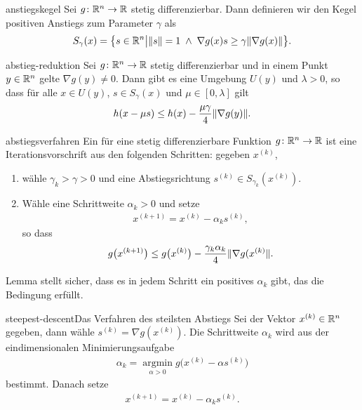 \begin{Definition}{anstiegskegel}
  Sei $g\colon \mathbb R^n\to \mathbb R$ stetig differenzierbar. Dann definieren wir
  den Kegel positiven Anstiegs zum Parameter $\gamma$ als
  \begin{gather}
    S_\gamma(x) = \bigl\{ s\in\mathbb R^n \big|
    \lVert s\rVert = 1 \;\wedge \;
    \nabla g(x)s \ge \gamma\lVert\nabla g(x)\rVert
    \bigr\}.
  \end{gather}  
\end{Definition}

\begin{Lemma}{abstieg-reduktion}
  Sei $g\colon\mathbb R^n\to\mathbb R$ stetig differenzierbar und in einem Punkt
  $y\in\mathbb R^n$ gelte $\nabla g(y) \neq 0$. Dann gibt es eine Umgebung
  $U(y)$ und $\lambda>0$, so dass für alle $x\in U(y)$,
  $s\in S_\gamma(x)$ und $\mu\in [0,\lambda]$ gilt
  \begin{gather}
    h(x-\mu s) \le h(x) - \frac{\mu\gamma}4 \lVert\nabla g(y)\rVert.
  \end{gather}
\end{Lemma}

\begin{Definition}{abstiegsverfahren}
  Ein  für eine stetig differenzierbare
  Funktion $g\colon \mathbb R^n\to\mathbb R$ ist eine Iterationsvorschrift aus den
  folgenden Schritten: gegeben $x^{(k)}$,
  \begin{enumerate}
  \item wähle $\gamma_k>\gamma>0$ und eine Abstiegsrichtung
    $s^{(k)} \in S_{\gamma_k}(x^{(k)})$.
  \item Wähle eine Schrittweite $\alpha_k>0$ und setze
    \begin{gather}
      x^{(k+1)} = x^{(k)} - \alpha_k s^{(k)},
    \end{gather}
    so dass
    \begin{gather}
      \label{eq:newton:7}
      g\bigl(x^{(k+1)}\bigr)
      \le g\bigl(x^{(k)}\bigr) - \frac{\gamma_k\alpha_k}{4}\lVert\nabla g(x^{(k)}\rVert.
    \end{gather}
  \end{enumerate}
\end{Definition}

\begin{remark}
  Lemma  stellt sicher, dass es in
  jedem Schritt ein positives $\alpha_k$ gibt, das die Bedingung
  erfüllt.
\end{remark}

\begin{Beispiel*}{steepest-descent}{Das Verfahren des steilsten Abstiegs}
  Sei der Vektor $x^{(k)} \in\mathbb R^n$ gegeben, dann wähle
  $s^{(k)} = \nabla g(x^{(k)})$. Die Schrittweite $\alpha_k$ wird aus
  der eindimensionalen Minimierungsaufgabe
  \begin{gather}
    \alpha_k = \operatorname*{argmin}_{\alpha>0}
    g\bigl(x^{(k)} - \alpha s^{(k)}\bigr)
  \end{gather}
  bestimmt. Danach setze
  \begin{gather}
    x^{(k+1)} = x^{(k)} - \alpha_k s^{(k)}.
  \end{gather}
\end{Beispiel*}

